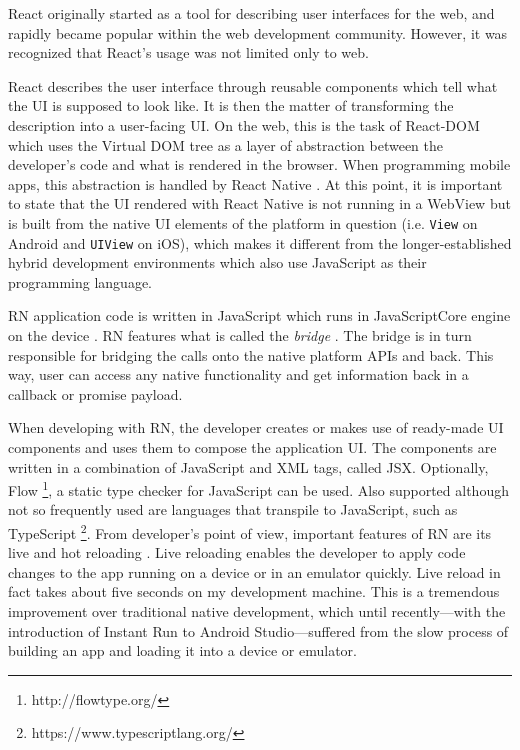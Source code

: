 React originally started as a tool for describing user interfaces for the web, and rapidly became popular within the web development community. However, it was recognized that React's usage was not limited only to web.

React describes the user interface through reusable components which tell what the UI is supposed to look like. It is then the matter of transforming the description into a user-facing UI. On the web, this is the task of React-DOM \cite{learningRN} which uses the Virtual DOM tree as a layer of abstraction between the developer's code and what is rendered in the browser. When programming mobile apps, this abstraction is handled by React Native \cite{learningRN}. At this point, it is important to state that the UI rendered with React Native is not running in a WebView but is built from the native UI elements of the platform in question (i.e. \texttt{View} on Android and \texttt{UIView} on iOS), which makes it different from the longer-established hybrid development environments which also use JavaScript as their programming language. 

RN application code is written in JavaScript which runs in JavaScriptCore engine on the device \cite{rn:jsenviroment}. RN features what is called the \textit{bridge} \cite{rn:bridge}. The bridge is in turn responsible for bridging the calls onto the native platform APIs and back. This way, user can access any native functionality and get information back in a callback or promise payload.

When developing with RN, the developer creates or makes use of ready-made UI components and uses them to compose the application UI. The components are written in a combination of JavaScript and XML tags, called JSX. Optionally, Flow \footnote{http://flowtype.org/}, a static type checker for JavaScript can be used. Also supported although not so frequently used are languages that transpile to JavaScript, such as TypeScript \footnote{https://www.typescriptlang.org/}. From developer's point of view, important features of RN are its live and hot reloading \cite{rn:hotreload}. Live reloading  enables the developer to apply code changes to the app running on a device or in an emulator quickly. Live reload in fact takes about five seconds on my development machine. This is a tremendous improvement over traditional native development, which until recently---with the introduction of Instant Run to Android Studio---suffered from the slow process of building an app and loading it into a device or emulator.

